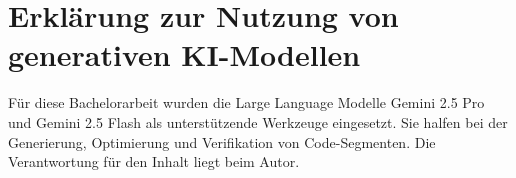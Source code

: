 \section*{Erklärung zur Nutzung von generativen KI-Modellen}

Für diese Bachelorarbeit wurden die Large Language Modelle Gemini 2.5 Pro und Gemini 2.5 Flash \parencite{gemini_team_gemini_2025} als unterstützende Werkzeuge eingesetzt. Sie halfen bei der Generierung, Optimierung und Verifikation von Code-Segmenten. Die Verantwortung für den Inhalt liegt beim Autor.